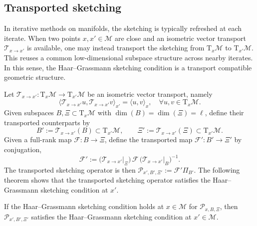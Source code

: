 \documentclass[final,onefignum,onetabnum]{siamart250211}
\begin{document}
\subsection{Transported sketching}
\label{subsec:transported-sketching}
In iterative methods on manifolds, the sketching is typically refreshed at each iterate.
When two points $x,x'\in\mathcal M$ are close and an isometric vector transport $\mathcal T_{x\to x'}$ is available, one may instead transport the sketching from $\mathrm T_x\mathcal M$ to $\mathrm T_{x'}\mathcal M$.
This reuses a common low-dimensional subspace structure across nearby iterates.
In this sense, the Haar--Grassmann sketching condition is a transport compatible geometric structure.

Let $\mathcal T_{x\to x'}:\mathrm T_x\mathcal M\to \mathrm T_{x'}\mathcal M$ be an isometric vector transport, namely
\[
\langle \mathcal T_{x\to x'}u,\mathcal T_{x\to x'}v\rangle_{x'}=\langle u,v\rangle_x, \quad \forall u,v\in\mathrm T_x\mathcal M.
\]
Given subspaces $B,\Xi\subset\mathrm T_x\mathcal M$ with $\dim(B)=\dim(\Xi)=\ell$, define their transported counterparts by
\[
B' := \mathcal T_{x\to x'}(B)\subset\mathrm T_{x'}\mathcal M,
\qquad
\Xi' := \mathcal T_{x\to x'}(\Xi)\subset\mathrm T_{x'}\mathcal M.
\]
Given a full-rank map $\mathcal F:B\to\Xi$, define the transported map $\mathcal F':B'\to\Xi'$ by conjugation,
\begin{equation}
\label{eq:transported-F}
\mathcal F'
:= \bigl(\mathcal T_{x\to x'}\vert_{\Xi}\bigr)\,\mathcal F\,\bigl(\mathcal T_{x\to x'}\vert_{B}\bigr)^{-1}.
\end{equation}
The transported sketching operator is then $\mathcal P_{x',B',\Xi'}:=\mathcal F'\Pi_{B'}$.
The following theorem shows that the transported sketching operator satisfies the Haar--Grassmann sketching condition at $x'$.


 \begin{theorem}
 \label{thm:transport-closure-iff-haar}
  If the Haar--Grassmann sketching condition holds at $x \in \mathcal{M}$ for $\mathcal P_{x,B,\Xi}$, then $\mathcal P_{x',B',\Xi'}$ satisfies the Haar--Grassmann sketching condition at $x' \in \mathcal{M}$.
 \end{theorem}
\end{document}
